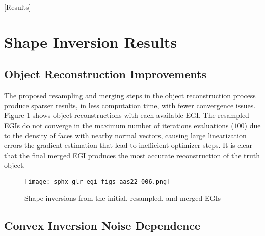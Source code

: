 [Results]
\graphicspath{{/Users/liamrobinson/Documents/PyLightCurves/docs/build/html/_images}}

\section{Shape Inversion Results}



\subsection{Object Reconstruction Improvements}

The proposed resampling and merging steps in the object reconstruction process produce sparser results, in less computation time, with fewer convergence issues. Figure \ref{fig:egi_reconstructions} shows object reconstructions with each available EGI. The resampled EGIs do not converge in the maximum number of iterations evaluations ($100$) due to the density of faces with nearby normal vectors, causing large linearization errors the gradient estimation that lead to inefficient optimizer steps. It is clear that the final merged EGI produces the most accurate reconstruction of the truth object.

\begin{figure}[!htb]
  \centering
  \texttt{[image: sphx\_glr\_egi\_figs\_aas22\_006.png]}
  \caption{Shape inversions from the initial, resampled, and merged EGIs}
  \label{fig:egi_reconstructions}
\end{figure}


\subsection{Convex Inversion Noise Dependence}

